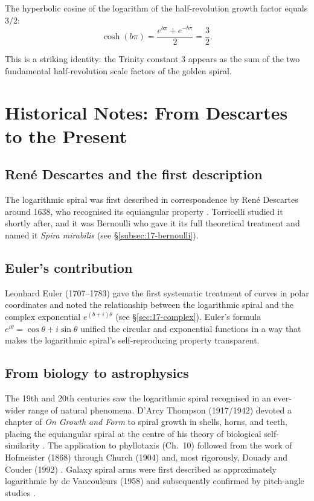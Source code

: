 \begin{corollary}
The hyperbolic cosine of the logarithm of the half-revolution
growth factor equals \(3/2\):
\[
  \cosh(b\pi) = \frac{e^{b\pi}+e^{-b\pi}}{2} = \frac{3}{2}.
\]
\end{corollary}

This is a striking identity: the Trinity constant \(3\) appears
as the sum of the two fundamental half-revolution scale factors
of the golden spiral.

\section{Historical Notes: From Descartes to the Present}
\label{sec:17-history}

\subsection{René Descartes and the first description}
\label{subsec:17-descartes}

The logarithmic spiral was first described in correspondence by
René Descartes around 1638, who recognised its equiangular
property \cite{boyer_history}.  Torricelli studied it shortly
after, and it was Bernoulli who gave it its full theoretical
treatment and named it \textit{Spira mirabilis} (see
\S\ref{subsec:17-bernoulli}).

\subsection{Euler's contribution}
\label{subsec:17-euler}

Leonhard Euler (1707--1783) gave the first systematic treatment
of curves in polar coordinates and noted the relationship between
the logarithmic spiral and the complex exponential
\(e^{(b+i)\theta}\) (see \S\ref{sec:17-complex}).  Euler's
formula \(e^{i\theta} = \cos\theta + i\sin\theta\) unified the
circular and exponential functions in a way that makes the
logarithmic spiral's self-reproducing property transparent.

\subsection{From biology to astrophysics}
\label{subsec:17-bio-to-astro}

The 19th and 20th centuries saw the logarithmic spiral recognised
in an ever-wider range of natural phenomena.  D'Arcy Thompson
(1917/1942) devoted a chapter of \textit{On Growth and Form} to
spiral growth in shells, horns, and teeth, placing the
equiangular spiral at the centre of his theory of biological
self-similarity \cite{boyer_history}.  The application to
phyllotaxis (Ch.~10) followed from the work of Hofmeister (1868)
through Church (1904) and, most rigorously, Douady and Couder
(1992) \cite{douady_couder_phyllotaxis}.  Galaxy spiral arms were
first described as approximately logarithmic by de Vaucouleurs
(1958) and subsequently confirmed by pitch-angle studies
\cite{seigar_galaxy_pitch}.

